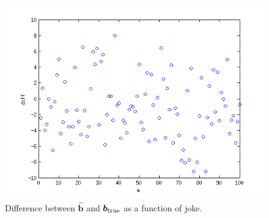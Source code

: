 \documentclass{article}
\begin{document}
\begin{homeworkProblem}
    \begin{figure}
        
        \includegraphics[width=\linewidth]{prob1_fig.png}

        \caption{\label{fig:prob1} Difference between $\bm{\hat{b}}$ and
        $\bm{b}_{\rm true}$ as a function of joke.}

    \end{figure} 

\end{homeworkProblem}
\clearpage
\end{document}

